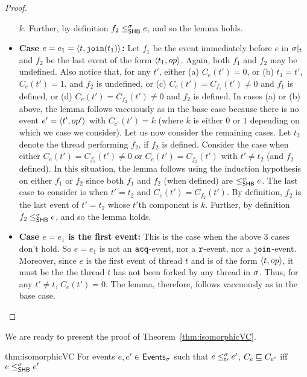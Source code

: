 \begin{proof}
\begin{itemize}
  $k$. Further, by definition $f_2 \leq^{\sigma}_{\mathsf{SHB}} e$, and so the lemma
  holds.
\item {\bf Case $e = e_1 = \langle t,\mathtt{join}(t_1)\rangle$:} Let $f_1$ be the event
  immediately before $e$ in $\sigma|_{t}$ and $f_2$ be the last
  event of the form $\langle t_1,op\rangle$. Again, both $f_1$ and $f_2$ may be
  undefined. Also notice that, for any $t'$, either (a) $C_e(t') = 0$,
  or (b) $t_1 = t'$, $C_e(t') = 1$, and $f_2$ is undefined, or (c)
  $C_e(t') = C_{f_1}(t') \neq 0$ and $f_1$ is defined, or (d) $C_e(t')
  = C_{f_2}(t') \neq 0$ and $f_2$ is defined. In cases (a) or (b)
  above, the lemma follows vaccuously as in the base case because
  there is no event $e' = \langle t',op'\rangle$ with $C_{e'}(t') = k$ (where
  $k$ is either $0$ or $1$ depending on which we case we
  consider). Let us now consider the remaining cases. Let $t_2$ denote
  the thread performing $f_2$, if $f_2$ is defined. Consider the case
  when either $C_e(t') = C_{f_1}(t') \neq 0$ or $C_e(t') =
  C_{f_2}(t')$ with $t' \neq t_2$ (and $f_2$ defined). In this
  situation, the lemma follows using the induction hypothesis on
  either $f_1$ or $f_2$ since both $f_1$ and $f_2$ (when defined) are
  $\leq^{\sigma}_{\mathsf{SHB}} e$. The last case to consider is when $t' = t_2$ and
  $C_e(t') = C_{f_2}(t')$. By definition, $f_2$ is the last event of
  $t' = t_2$ whose $t'$th component is $k$. Further, by definition
  $f_2 \leq^{\sigma}_{\mathsf{SHB}} e$, and so the lemma holds.
\item {\bf Case $e = e_1$ is the first event:} This is the case when 
  the above 3 cases don't hold. So $e = e_1$ is not an $\mathtt{acq}$-event,
  nor a $\mathtt{r}$-event, nor a $\mathtt{join}$-event. Moreover, since $e$ is the
  first event of thread $t$ and is of the form $\langle t,op\rangle$, it must be
  the the thread $t$ has not been forked by any thread in $\sigma$. Thus,
  for any $t' \neq t$, $C_e(t') = 0$. The lemma, therefore, follows
  vaccuously as in the base case. \qedhere
\end{itemize}
\end{proof}

We are ready to present the proof of Theorem~\ref{thm:isomorphicVC}.

\begin{reptheorem}{thm:isomorphicVC}
For events $e, e' \in \mathsf{Events}_{\sigma}$ such that $e \leq^{\sigma}_{\mathsf{tr}} e'$,
$C_e \sqsubseteq C_{e'}$ iff $e \leq^{\sigma}_{\mathsf{SHB}} e'$
\end{reptheorem}

